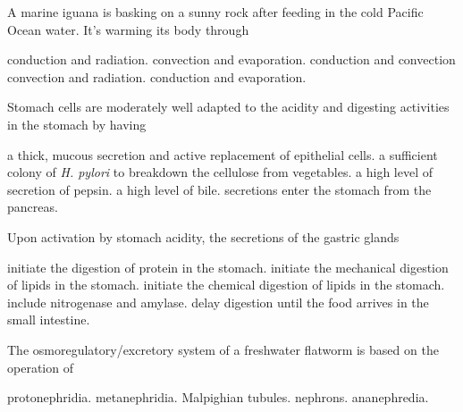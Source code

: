 
\question

\begin{choices}
\correctchoice  %
\choice  %
\choice  %
\choice  %
\choice  %
\end{choices}



\question
A marine iguana is basking on a sunny rock after feeding in the cold Pacific Ocean water. It's warming its body through 

\begin{choices}
\correctchoice conduction and radiation. %
\choice convection and evaporation. %
\choice conduction and convection %
\choice convection and radiation.  %
\choice conduction and evaporation. %
\end{choices}


\question
Stomach cells are moderately well adapted to the acidity and digesting activities in the stomach by having

\begin{choices}
\correctchoice a thick, mucous secretion and active replacement of epithelial cells. %
\choice a sufficient colony of \textit{H. pylori} to breakdown the cellulose from vegetables. %
\choice a high level of secretion of pepsin. %
\choice a high level of bile. %
\choice secretions enter the stomach from the pancreas. %
\end{choices}


\question
Upon activation by stomach acidity, the secretions of the gastric glands

\begin{choices}
\correctchoice initiate the digestion of protein in the stomach. %
\choice initiate the mechanical digestion of lipids in the stomach. %
\choice initiate the chemical digestion of lipids in the stomach.  %
\choice include nitrogenase and amylase. %
\choice delay digestion until the food arrives in the small intestine. %
\end{choices}



\question
The osmoregulatory/excretory system of a freshwater flatworm is based on the operation of

\begin{choices}
\correctchoice protonephridia. %
\choice metanephridia. %
\choice Malpighian tubules. %
\choice nephrons. %
\choice ananephredia. %
\end{choices}


